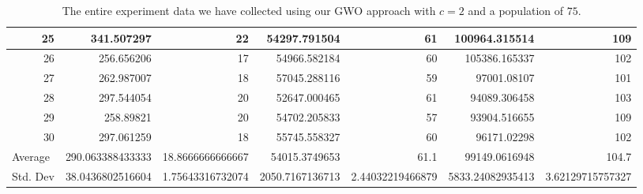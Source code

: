 \begin{table}
\begin{adjustwidth}{}{}
{{\begin{tabular}{|r|r|r|r|r|r|r|}
					\hline
					25                                         & 341.507297                   & 22                                    & 54297.791504                   & 61                                    & 100964.315514                & 109                                    \\ 
					\hline
					26                                         & 256.656206                   & 17                                    & 54966.582184                   & 60                                    & 105386.165337                & 102                                    \\ 
					\hline
					27                                         & 262.987007                   & 18                                    & 57045.288116                   & 59                                    & 97001.08107                  & 101                                    \\ 
					\hline
					28                                         & 297.544054                   & 20                                    & 52647.000465                   & 61                                    & 94089.306458                 & 103                                    \\ 
					\hline
					29                                         & 258.89821                    & 20                                    & 54702.205833                   & 57                                    & 93904.516655                 & 109                                    \\ 
					\hline
					30                                         & 297.061259                   & 18                                    & 55745.558327                   & 60                                    & 96171.02298                  & 102                                    \\ 
					\hline
					\multicolumn{1}{|l|}{Average}              & 290.063388433333             & 18.8666666666667                      & 54015.3749653                  & 61.1                                  & 99149.0616948                & 104.7                                  \\ 
					\hline
					\multicolumn{1}{|l|}{Std. Dev}             & 38.0436802516604             & 1.75643316732074                      & 2050.7167136713                & 2.44032219466879                      & 5833.24082935413             & 3.62129715757327                       \\
					\hline
		\end{tabular}}}
	\end{adjustwidth}
	\caption{The entire experiment data we have collected using our GWO approach with $c = 2$ and a population of $75$.}
	\label{full-data-gwo-c2-p75}
\end{table}

